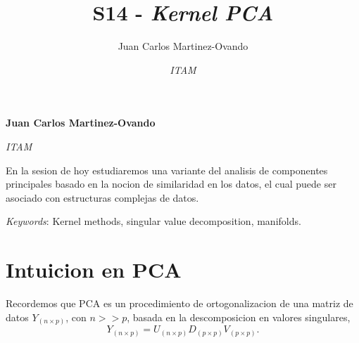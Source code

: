 \documentclass[11pt,]{article}
\title{S14 - \emph{Kernel PCA}  }
\author{\Large Juan Carlos Martinez-Ovando\vspace{0.05in} \newline\normalsize\emph{}   \and \Large \vspace{0.05in} \newline\normalsize\emph{ITAM}  }
\date{}
\newcommand*{\authorfont}{\fontfamily{phv}\selectfont}
\renewenvironment{abstract}
 {{%
    \setlength{\leftmargin}{0mm}
    \setlength{\rightmargin}{\leftmargin}%
  }%
  \relax}
 {\endlist}
\begin{document}
	
%

{%
\setlength{\parindent}{0pt}
\thispagestyle{plain}
{\fontsize{18}{20}\selectfont\raggedright 
\maketitle  %

}

{
   \vskip 13.5pt\relax \normalsize\fontsize{11}{12} 
\textbf{\authorfont Juan Carlos Martinez-Ovando} \hskip 15pt \emph{\small }   \par \textbf{\authorfont } \hskip 15pt \emph{\small ITAM}   

}

}








\begin{abstract}

    \hbox{\vrule height .2pt width 39.14pc}

    \vskip 8.5pt %

\noindent En la sesion de hoy estudiaremos una variante del analisis de
componentes principales basado en la nocion de similaridad en los datos,
el cual puede ser asociado con estructuras complejas de datos.


\vskip 8.5pt \noindent \emph{Keywords}: Kernel methods, singular value decomposition, manifolds. \par

    \hbox{\vrule height .2pt width 39.14pc}



\end{abstract}


\vskip 6.5pt


\noindent  \section{Intuicion en PCA}\label{intuicion-en-pca}

Recordemos que PCA es un procedimiento de ortogonalizacion de una matriz
de datos \(Y_{(n\times p)}\), con \(n >> p\), basada en la
descomposicion en valores singulares, \[
  Y_{(n\times p)} = 
    U_{(n\times p)} 
    D_{(p\times p)} 
    V_{(p\times p)}.
\]
\end{document}
